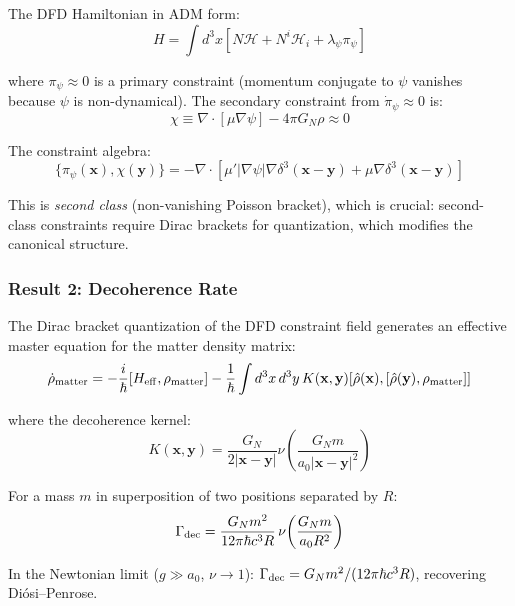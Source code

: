 \documentclass[11pt,a4paper]{article}
\begin{document}
The DFD Hamiltonian in ADM form:
\begin{equation}
H = \int d^3x\left[N\mathcal{H} + N^i\mathcal{H}_i + \lambda_\psi\pi_\psi\right]
\end{equation}

where $\pi_\psi \approx 0$ is a primary constraint (momentum conjugate to $\psi$ vanishes because $\psi$ is non-dynamical). The secondary constraint from $\dot{\pi}_\psi \approx 0$ is:
\begin{equation}
\chi \equiv \nabla\cdot\left[\mu\nabla\psi\right] - 4\pi G_N\rho \approx 0
\end{equation}

The constraint algebra:
\begin{equation}
\{\pi_\psi(\mathbf{x}), \chi(\mathbf{y})\} = -\nabla\cdot\left[\mu'|\nabla\psi|\nabla\delta^3(\mathbf{x}-\mathbf{y}) + \mu\nabla\delta^3(\mathbf{x}-\mathbf{y})\right]
\end{equation}

This is \emph{second class} (non-vanishing Poisson bracket), which is crucial: second-class constraints require Dirac brackets for quantization, which modifies the canonical structure.

\subsubsection{Result 2: Decoherence Rate}

The Dirac bracket quantization of the DFD constraint field generates an effective master equation for the matter density matrix:
\begin{equation}
\dot{\rho}_{\rm matter} = -\frac{i}{\hbar}[H_{\rm eff}, \rho_{\rm matter}] - \frac{1}{\hbar}\int d^3x\,d^3y\,K(\mathbf{x},\mathbf{y})[\hat{\rho}(\mathbf{x}), [\hat{\rho}(\mathbf{y}), \rho_{\rm matter}]]
\end{equation}

where the decoherence kernel:
\begin{equation}
K(\mathbf{x},\mathbf{y}) = \frac{G_N}{2|\mathbf{x}-\mathbf{y}|}\nu\!\left(\frac{G_N m}{a_0|\mathbf{x}-\mathbf{y}|^2}\right)
\end{equation}

For a mass $m$ in superposition of two positions separated by $R$:
\begin{equation}
\Gamma_{\rm dec} = \frac{G_N m^2}{12\pi\hbar c^3 R}\,\nu\!\left(\frac{G_N m}{a_0 R^2}\right)
\end{equation}

In the Newtonian limit ($g \gg a_0$, $\nu \to 1$): $\Gamma_{\rm dec} = G_N m^2/(12\pi\hbar c^3 R)$, recovering Di\'{o}si--Penrose.
\end{document}
